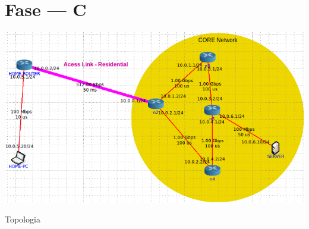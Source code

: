 \section{Fase --- C}

\begin{center}
 	
 	\includegraphics[width=\textwidth,height=\textheight,keepaspectratio]{resources/images/Alinea1/topologia.png}
 	\captionsetup{type=figure, width=0.8\linewidth}
	\caption{Topologia}
\label{fig:ssec1:topologia} 
\end{center}






